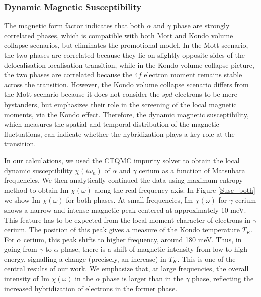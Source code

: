 \documentclass[10pt]{ruthesis}
\begin{document}
{\subsubsection{ Dynamic Magnetic Susceptibility}
The magnetic form factor indicates that both $\alpha$ and $\gamma$ phase are strongly
correlated phases, which is compatible with both Mott and Kondo volume
collapse scenarios, but eliminates the promotional model.  In the Mott
scenario, the two phases are correlated because they lie on slightly
opposite sides of the delocalisation-localisation transition, while in
the Kondo volume collapse picture, the two phases are correlated
because the $4f$ electron moment remains stable across the transition.
However, the Kondo
volume collapse scenario differs from the Mott scenario because it
does not consider the $spd$ electrons to be mere bystanders, but
emphasizes their role in the screening of the local magnetic moments,
via the Kondo effect.  Therefore, the dynamic magnetic susceptibility,
which measures the spatial and temporal distribution of the magnetic
fluctuations, can indicate whether the hybridization plays a key role
at the transition.

In our calculations, we used the CTQMC impurity solver to obtain the
local dynamic  susceptibility $\chi(i\omega_n)$ of $\alpha$ and
$\gamma$ cerium as a function of Matsubara frequencies.  We then
analytically continued the data using maximum entropy method to obtain
Im $\chi (\omega)$ along the real frequency axis.  In Figure
\ref{Susc_both} we show Im $\chi(\omega)$ for both phases.  At small
frequencies, Im $\chi (\omega)$ for $\gamma$ cerium shows a narrow and
intense magnetic peak centered at approximately 10 meV. This feature
has to be expected from the local moment character of electrons in
$\gamma$ cerium.  The position of this peak gives a measure of the
Kondo temperature $T_K$.  For $\alpha$ cerium, this peak shifts to
higher frequency, around 180 meV.  Thus, in going from
$\gamma$ to $\alpha$ phase, there is a shift of magnetic intensity
from low to high energy, signalling a change (precisely, an increase)
in $T_K$.  This is one of the central results of our work.  We
emphasize that, at large frequencies, the overall intensity of Im
$\chi (\omega)$ in the $\alpha$ phase is larger than in the $\gamma$
phase, reflecting the increased hybridization of electrons in the
former phase.


}
\end{document}
